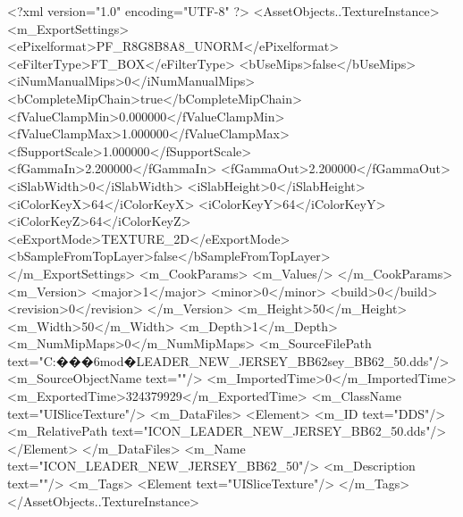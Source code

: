 <?xml version="1.0" encoding="UTF-8" ?>
<AssetObjects..TextureInstance>
	<m_ExportSettings>
		<ePixelformat>PF_R8G8B8A8_UNORM</ePixelformat>
		<eFilterType>FT_BOX</eFilterType>
		<bUseMips>false</bUseMips>
		<iNumManualMips>0</iNumManualMips>
		<bCompleteMipChain>true</bCompleteMipChain>
		<fValueClampMin>0.000000</fValueClampMin>
		<fValueClampMax>1.000000</fValueClampMax>
		<fSupportScale>1.000000</fSupportScale>
		<fGammaIn>2.200000</fGammaIn>
		<fGammaOut>2.200000</fGammaOut>
		<iSlabWidth>0</iSlabWidth>
		<iSlabHeight>0</iSlabHeight>
		<iColorKeyX>64</iColorKeyX>
		<iColorKeyY>64</iColorKeyY>
		<iColorKeyZ>64</iColorKeyZ>
		<eExportMode>TEXTURE_2D</eExportMode>
		<bSampleFromTopLayer>false</bSampleFromTopLayer>
	</m_ExportSettings>
	<m_CookParams>
		<m_Values/>
	</m_CookParams>
	<m_Version>
		<major>1</major>
		<minor>0</minor>
		<build>0</build>
		<revision>0</revision>
	</m_Version>
	<m_Height>50</m_Height>
	<m_Width>50</m_Width>
	<m_Depth>1</m_Depth>
	<m_NumMipMaps>0</m_NumMipMaps>
	<m_SourceFilePath text="C:\Users\jjj\Desktop\����6mod�LEADER_NEW_JERSEY_BB62sey_BB62_50.dds"/>
	<m_SourceObjectName text=""/>
	<m_ImportedTime>0</m_ImportedTime>
	<m_ExportedTime>324379929</m_ExportedTime>
	<m_ClassName text="UISliceTexture"/>
	<m_DataFiles>
		<Element>
			<m_ID text="DDS"/>
			<m_RelativePath text="ICON_LEADER_NEW_JERSEY_BB62_50.dds"/>
		</Element>
	</m_DataFiles>
	<m_Name text="ICON_LEADER_NEW_JERSEY_BB62_50"/>
	<m_Description text=""/>
	<m_Tags>
		<Element text="UISliceTexture"/>
	</m_Tags>
</AssetObjects..TextureInstance>

